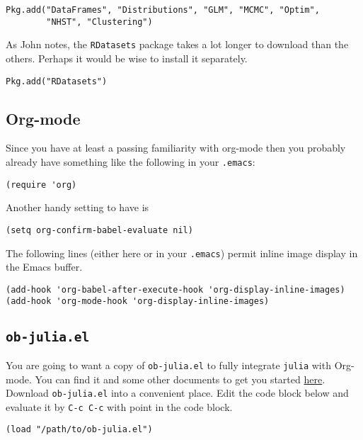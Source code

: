 \documentclass[11pt]{article}
\begin{document}
\begin{verbatim}
Pkg.add("DataFrames", "Distributions", "GLM", "MCMC", "Optim", 
        "NHST", "Clustering")
\end{verbatim}

As John notes, the \texttt{RDatasets} package takes a lot longer to download
than the others.  Perhaps it would be wise to install it separately.

\begin{verbatim}
Pkg.add("RDatasets")
\end{verbatim}
\subsection[Org-mode]{Org-mode}
\label{sec-1-4}

Since you have at least a passing familiarity with org-mode then you
probably already have something like the following in your \texttt{.emacs}:

\begin{verbatim}
(require 'org)
\end{verbatim}

Another handy setting to have is

\begin{verbatim}
(setq org-confirm-babel-evaluate nil)
\end{verbatim}

The following lines (either here or in your \texttt{.emacs}) permit inline
image display in the Emacs buffer.

\begin{verbatim}
(add-hook 'org-babel-after-execute-hook 'org-display-inline-images)   
(add-hook 'org-mode-hook 'org-display-inline-images)
\end{verbatim}
\subsection[\texttt{ob-julia.el}]{\texttt{ob-julia.el}}
\label{sec-1-5}

You are going to want a copy of \texttt{ob-julia.el} to fully integrate
\texttt{julia} with Org-mode.  You can find it and some other documents to
get you started \href{https://github.com/gjkerns/ob-julia}{here}.  Download \texttt{ob-julia.el} into a convenient place.
Edit the code block below and evaluate it by \texttt{C-c C-c} with point in
the code block.

\begin{verbatim}
(load "/path/to/ob-julia.el")
\end{verbatim}
\end{document}
